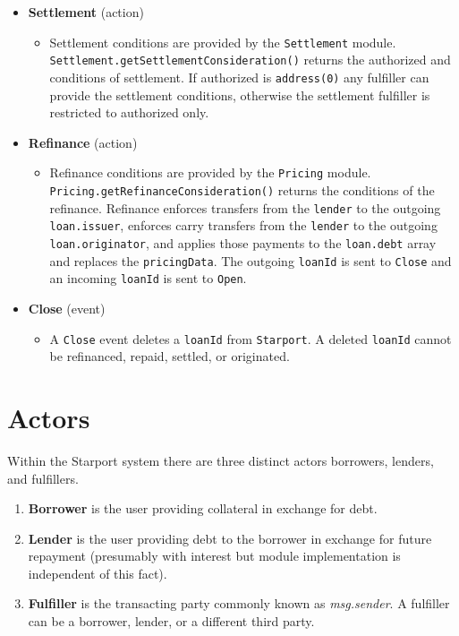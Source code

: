 \documentclass[12pt]{article}
\begin{document}
\begin{itemize}
	\item \textbf{Settlement} (action)
	\begin{itemize}
		\item Settlement conditions are provided by the \texttt{Settlement} module.\\\texttt{Settlement.getSettlementConsideration()} returns the authorized and conditions of settlement. If authorized is \texttt{address(0)} any fulfiller can provide the settlement conditions, otherwise the settlement fulfiller is restricted to authorized only.
	\end{itemize}
	
	\item \textbf{Refinance} (action)
	\begin{itemize}
		\item Refinance conditions are provided by the \texttt{Pricing} module.\\\texttt{Pricing.getRefinanceConsideration()} returns the conditions of the refinance. Refinance enforces transfers from the \texttt{lender} to the outgoing \texttt{loan.issuer}, enforces carry transfers from the \texttt{lender} to the outgoing \texttt{loan.originator}, and applies those payments to the \texttt{loan.debt} array and replaces the \texttt{pricingData}. The outgoing \texttt{loanId} is sent to \texttt{Close} and an incoming \texttt{loanId} is sent to \texttt{Open}.
	\end{itemize}
	
	\item \textbf{Close} (event)
	\begin{itemize}
		\item A \texttt{Close} event deletes a \texttt{loanId} from \texttt{Starport}. A deleted \texttt{loanId} cannot be refinanced, repaid, settled, or originated.
	\end{itemize}
\end{itemize}

\section{Actors}
Within the Starport system there are three distinct actors borrowers, lenders, and fulfillers.
\begin{enumerate}
	\item \textbf{Borrower} is the user providing collateral in exchange for debt.
	\item \textbf{Lender} is the user providing debt to the borrower in exchange for future repayment (presumably with interest but module implementation is independent of this fact).
	\item \textbf{Fulfiller} is the transacting party commonly known as \emph{msg.sender}. A fulfiller can be a borrower, lender, or a different third party.
\end{enumerate}
\end{document}
